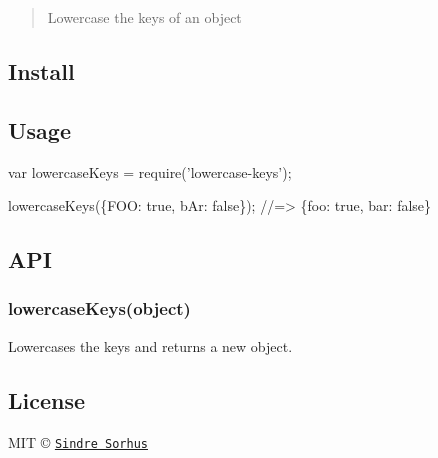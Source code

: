 \begin{quote}
Lowercase the keys of an object \end{quote}


\subsection*{Install}




\subsection*{Usage}


\begin{DoxyCode}
var lowercaseKeys = require('lowercase-keys');

lowercaseKeys(\{FOO: true, bAr: false\});
//=> \{foo: true, bar: false\}
\end{DoxyCode}


\subsection*{A\+PI}

\subsubsection*{lowercase\+Keys(object)}

Lowercases the keys and returns a new object.

\subsection*{License}

M\+IT © \href{http://sindresorhus.com}{\tt Sindre Sorhus} 
